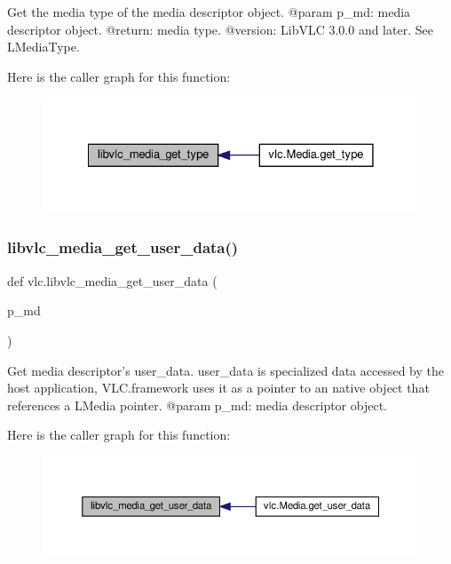 \begin{DoxyVerb}Get the media type of the media descriptor object.
@param p_md: media descriptor object.
@return: media type.
@version: LibVLC 3.0.0 and later. See L{MediaType}.
\end{DoxyVerb}
 Here is the caller graph for this function\+:
\nopagebreak
\begin{figure}[H]
\begin{center}
\leavevmode
\includegraphics[width=328pt]{namespacevlc_a0c521348122d78764b8a4e7cae989a7f_icgraph}
\end{center}
\end{figure}
\mbox{\label{namespacevlc_ad55abeb96ec792844832bd7fd31ac0ed}} 
\subsubsection{\texorpdfstring{libvlc\+\_\+media\+\_\+get\+\_\+user\+\_\+data()}{libvlc\_media\_get\_user\_data()}}
{\footnotesize\ttfamily def vlc.\+libvlc\+\_\+media\+\_\+get\+\_\+user\+\_\+data (\begin{DoxyParamCaption}\item[{}]{p\+\_\+md }\end{DoxyParamCaption})}

\begin{DoxyVerb}Get media descriptor's user_data. user_data is specialized data
accessed by the host application, VLC.framework uses it as a pointer to
an native object that references a L{Media} pointer.
@param p_md: media descriptor object.
\end{DoxyVerb}
 Here is the caller graph for this function\+:
\nopagebreak
\begin{figure}[H]
\begin{center}
\leavevmode
\includegraphics[width=350pt]{namespacevlc_ad55abeb96ec792844832bd7fd31ac0ed_icgraph}
\end{center}
\end{figure}
\mbox{\label{namespacevlc_af75d6b6731001b99235738f78e0cf67f}} 
